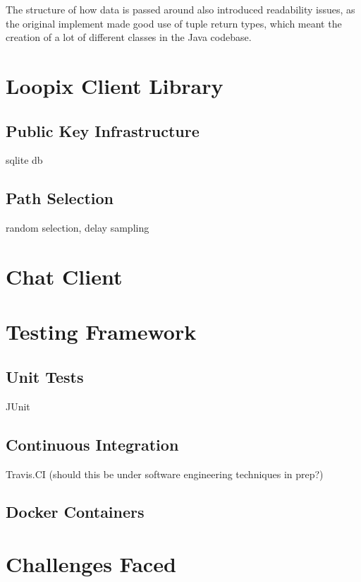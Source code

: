 \documentclass[final,dissertation.tex]{subfiles}
\begin{document}
The structure of how data is passed around also introduced readability issues, as the original implement made good use of tuple return types, which meant the creation of a lot of different classes in the Java codebase.

\section{Loopix Client Library}

\subsection{Public Key Infrastructure}

sqlite db

\subsection{Path Selection}

random selection, delay sampling

\section{Chat Client}

\section{Testing Framework}

\subsection{Unit Tests}

JUnit

\subsection{Continuous Integration}

Travis.CI (should this be under software engineering techniques in prep?)

\subsection{Docker Containers}

\section{Challenges Faced}
\end{document}
